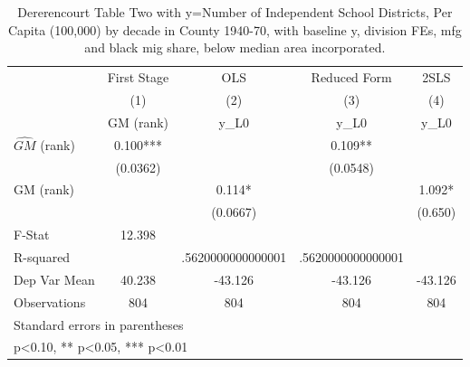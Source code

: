 \begin{table}[htbp]\centering
\def\sym#1{\ifmmode^{#1}\else\(^{#1}\)\fi}
\caption{Dererencourt Table Two with y=Number of Independent School Districts, Per Capita (100,000) by decade in County 1940-70, with baseline y, division FEs, mfg and black mig share, below median area incorporated.}
\begin{tabular}{l*{4}{c}}
\toprule
                    & First Stage   &         OLS   &Reduced Form   &        2SLS   \\
                    &\multicolumn{1}{c}{(1)}&\multicolumn{1}{c}{(2)}&\multicolumn{1}{c}{(3)}&\multicolumn{1}{c}{(4)}\\
                    &\multicolumn{1}{c}{GM  (rank)}&\multicolumn{1}{c}{y\_L0}&\multicolumn{1}{c}{y\_L0}&\multicolumn{1}{c}{y\_L0}\\
\midrule
$\hat{GM}$ (rank)   &       0.100***&               &       0.109** &               \\
                    &    (0.0362)   &               &    (0.0548)   &               \\
\addlinespace
GM  (rank)          &               &       0.114*  &               &       1.092*  \\
                    &               &    (0.0667)   &               &     (0.650)   \\
\midrule
F-Stat              &      12.398   &               &               &               \\
R-squared           &               &.5620000000000001   &.5620000000000001   &               \\
Dep Var Mean        &      40.238   &     -43.126   &     -43.126   &     -43.126   \\
Observations        &         804   &         804   &         804   &         804   \\
\bottomrule
\multicolumn{5}{l}{\footnotesize Standard errors in parentheses}\\
\multicolumn{5}{l}{\footnotesize * p<0.10, ** p<0.05, *** p<0.01}\\
\end{tabular}
\end{table}
